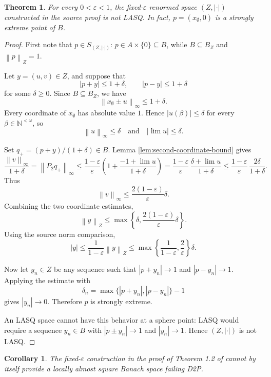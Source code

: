 \documentclass[11pt]{article}
\newtheorem{theorem}{Theorem}
\newtheorem{corollary}{Corollary}
\newcommand{\N}{\mathbb{N}}
\newcommand{\eps}{\varepsilon}
\newcommand{\norm}[1]{\left\lVert #1 \right\rVert}
\newcommand{\abs}[1]{\left\lvert #1 \right\rvert}
\begin{document}
\begin{theorem}\label{thm:not-lasq}
For every \(0<\eps<1\), the fixed-\(\eps\) renormed space
\((Z,\abs{\cdot})\) constructed in the source proof is not LASQ.  In fact,
\(p=(x_\emptyset,0)\) is a strongly extreme point of \(B\).
\end{theorem}

\begin{proof}
First note that \(p\in S_{(Z,\abs{\cdot})}\): \(p\in A\times\{0\}\subseteq B\),
while \(B\subseteq B_Z\) and \(\norm{p}_Z=1\).

Let \(y=(u,v)\in Z\), and suppose that
\[
\abs{p+y}\leq 1+\delta,
\qquad
\abs{p-y}\leq 1+\delta
\]
for some \(\delta\geq 0\).  Since \(B\subseteq B_Z\), we have
\[
\norm{x_\emptyset\pm u}_\infty\leq 1+\delta.
\]
Every coordinate of \(x_\emptyset\) has absolute value \(1\).  Hence
\(\abs{u(\beta)}\leq \delta\) for every \(\beta\in\N^{<\omega}\), so
\[
\norm{u}_\infty\leq \delta
\quad\text{and}\quad
\abs{\lim u}\leq \delta.
\]

Set \(q_+=(p+y)/(1+\delta)\in B\).  Lemma
\ref{lem:second-coordinate-bound} gives
\[
\frac{\norm{v}_\infty}{1+\delta}
=\norm{P_2q_+}_\infty
\leq
\frac{1-\eps}{\eps}
\left(1+\frac{-1+\lim u}{1+\delta}\right)
=
\frac{1-\eps}{\eps}\,
\frac{\delta+\lim u}{1+\delta}
\leq
\frac{1-\eps}{\eps}\,
\frac{2\delta}{1+\delta}.
\]
Thus
\[
\norm{v}_\infty\leq \frac{2(1-\eps)}{\eps}\delta.
\]
Combining the two coordinate estimates,
\[
\norm{y}_Z
\leq
\max\left\{\delta,\frac{2(1-\eps)}{\eps}\delta\right\}.
\]
Using the source norm comparison,
\[
\abs{y}
\leq
\frac{1}{1-\eps}\norm{y}_Z
\leq
\max\left\{\frac{1}{1-\eps},\frac{2}{\eps}\right\}\delta.
\]

Now let \(y_n\in Z\) be any sequence such that
\(\abs{p+y_n}\to 1\) and \(\abs{p-y_n}\to 1\).  Applying the estimate with
\[
\delta_n=\max\{\abs{p+y_n},\abs{p-y_n}\}-1
\]
gives \(\abs{y_n}\to 0\).  Therefore \(p\) is strongly extreme.

An LASQ space cannot have this behavior at a sphere point: LASQ would require
a sequence \(y_n\in B\) with \(\abs{p\pm y_n}\to 1\) and
\(\abs{y_n}\to 1\).  Hence \((Z,\abs{\cdot})\) is not LASQ.
\end{proof}

\begin{corollary}
The fixed-\(\eps\) construction in the proof of Theorem 1.2 of
\cite{RodriguezRuedaZoca2023} cannot by itself provide a locally almost square
Banach space failing D2P.
\end{corollary}
\end{document}
